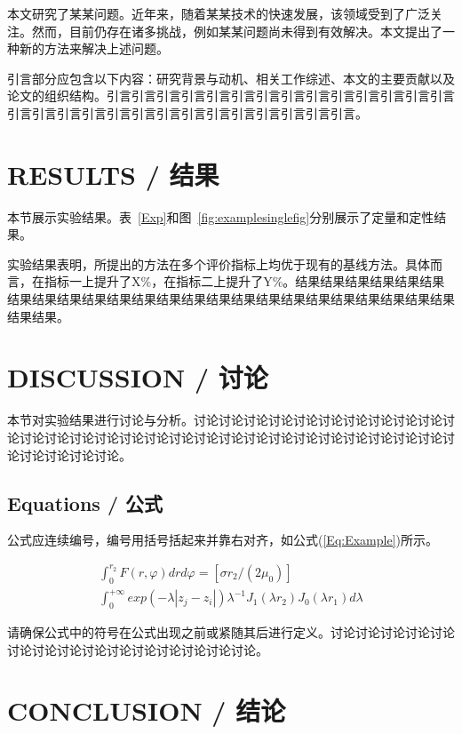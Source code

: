 \documentclass[journal]{IEEEtran}
\begin{document}
本文研究了某某问题。近年来，随着某某技术的快速发展，该领域受到了广泛关注。然而，目前仍存在诸多挑战，例如某某问题尚未得到有效解决。本文提出了一种新的方法来解决上述问题。

引言部分应包含以下内容：研究背景与动机、相关工作综述、本文的主要贡献以及论文的组织结构。引言引言引言引言引言引言引言引言引言引言引言引言引言引言引言引言引言引言引言引言引言引言引言引言引言引言引言引言。

\section{RESULTS / 结果}

本节展示实验结果。表~\ref{Exp}和图~\ref{fig:examplesinglefig}分别展示了定量和定性结果。

实验结果表明，所提出的方法在多个评价指标上均优于现有的基线方法。具体而言，在指标一上提升了X\%，在指标二上提升了Y\%。结果结果结果结果结果结果结果结果结果结果结果结果结果结果结果结果结果结果结果结果结果结果结果结果结果结果。

\section{DISCUSSION / 讨论}

本节对实验结果进行讨论与分析。讨论讨论讨论讨论讨论讨论讨论讨论讨论讨论讨论讨论讨论讨论讨论讨论讨论讨论讨论讨论讨论讨论讨论讨论讨论讨论讨论讨论讨论讨论讨论讨论讨论。

\subsection{Equations / 公式}
公式应连续编号，编号用括号括起来并靠右对齐，如公式(\ref{Eq:Example})所示。

\begin{equation}
\begin{multlined}
\int_{0}^{r_{2}} F(r,\varphi)dr d\varphi=[\sigma r_{2}/(2\mu_{0})]\\
\int_{0}^{+\infty}exp(-\lambda |z_{j}-z_{i} |)\lambda^{-1} J_{1}(\lambda r_{2}) J_{0}(\lambda r_{1})d\lambda
\label{Eq:Example}
\end{multlined}
\end{equation}

请确保公式中的符号在公式出现之前或紧随其后进行定义。讨论讨论讨论讨论讨论讨论讨论讨论讨论讨论讨论讨论讨论讨论讨论。

\section{CONCLUSION / 结论}
\end{document}
